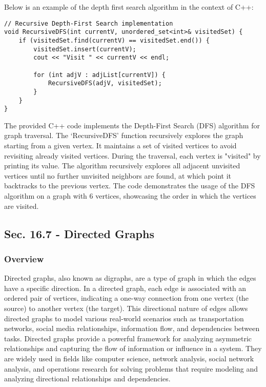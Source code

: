 \begin{solution}

Below is an example of the depth first search algorithm in the context of C++:

\horizontalline

\begin{verbatim}
// Recursive Depth-First Search implementation
void RecursiveDFS(int currentV, unordered_set<int>& visitedSet) {
    if (visitedSet.find(currentV) == visitedSet.end()) {
        visitedSet.insert(currentV);
        cout << "Visit " << currentV << endl;

        for (int adjV : adjList[currentV]) {
            RecursiveDFS(adjV, visitedSet);
        }
    }
}
\end{verbatim}

\horizontalline

\noindent The provided C++ code implements the Depth-First Search (DFS) algorithm for graph traversal. The `RecursiveDFS' function recursively explores the graph starting from a given vertex. It maintains a 
set of visited vertices to avoid revisiting already visited vertices. During the traversal, each vertex is "visited" by printing its value. The algorithm recursively explores all adjacent unvisited 
vertices until no further unvisited neighbors are found, at which point it backtracks to the previous vertex. The code demonstrates the usage of the DFS algorithm on a graph with 6 vertices, showcasing 
the order in which the vertices are visited.
    
\end{solution}

\subsection*{Sec. 16.7 - Directed Graphs}

\subsubsection{Overview}

Directed graphs, also known as digraphs, are a type of graph in which the edges have a specific direction. In a directed graph, each edge is associated with an ordered pair of vertices, indicating a one-way 
connection from one vertex (the source) to another vertex (the target). This directional nature of edges allows directed graphs to model various real-world scenarios such as transportation networks, social 
media relationships, information flow, and dependencies between tasks. Directed graphs provide a powerful framework for analyzing asymmetric relationships and capturing the flow of information or influence 
in a system. They are widely used in fields like computer science, network analysis, social network analysis, and operations research for solving problems that require modeling and analyzing directional 
relationships and dependencies.

